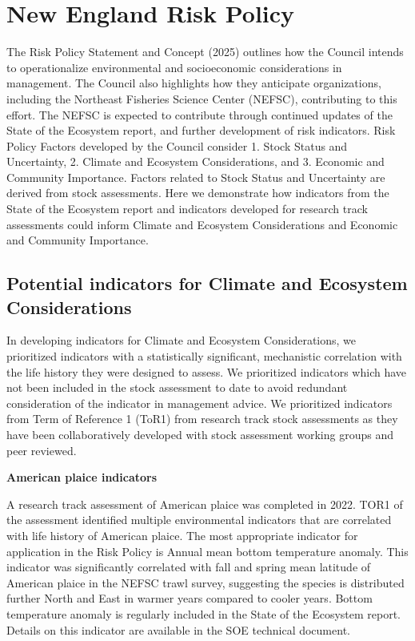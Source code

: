 \documentclass[
  10pt,
]{article}
\author{}
\date{\vspace{-2.5em}}
\begin{document}
{
\hypersetup{linkcolor=}
\setcounter{tocdepth}{2}
\tableofcontents
}
\section{New England Risk Policy}\label{new-england-risk-policy}

The Risk Policy Statement and Concept (2025) outlines how the Council intends to operationalize environmental and socioeconomic considerations in management. The Council also highlights how they anticipate organizations, including the Northeast Fisheries Science Center (NEFSC), contributing to this effort. The NEFSC is expected to contribute through continued updates of the State of the Ecosystem report, and further development of risk indicators. Risk Policy Factors developed by the Council consider 1. Stock Status and Uncertainty, 2. Climate and Ecosystem Considerations, and 3. Economic and Community Importance. Factors related to Stock Status and Uncertainty are derived from stock assessments. Here we demonstrate how indicators from the State of the Ecosystem report and indicators developed for research track assessments could inform Climate and Ecosystem Considerations and Economic and Community Importance.

\subsection{Potential indicators for Climate and Ecosystem Considerations}\label{potential-indicators-for-climate-and-ecosystem-considerations}

In developing indicators for Climate and Ecosystem Considerations, we prioritized indicators with a statistically significant, mechanistic correlation with the life history they were designed to assess. We prioritized indicators which have not been included in the stock assessment to date to avoid redundant consideration of the indicator in management advice. We prioritized indicators from Term of Reference 1 (ToR1) from research track stock assessments as they have been collaboratively developed with stock assessment working groups and peer reviewed.

\textbf{American plaice indicators}

A research track assessment of American plaice was completed in 2022. TOR1 of the assessment identified multiple environmental indicators that are correlated with life history of American plaice. The most appropriate indicator for application in the Risk Policy is Annual mean bottom temperature anomaly. This indicator was significantly correlated with fall and spring mean latitude of American plaice in the NEFSC trawl survey, suggesting the species is distributed further North and East in warmer years compared to cooler years. Bottom temperature anomaly is regularly included in the State of the Ecosystem report. Details on this indicator are available in the SOE technical document.
\end{document}
